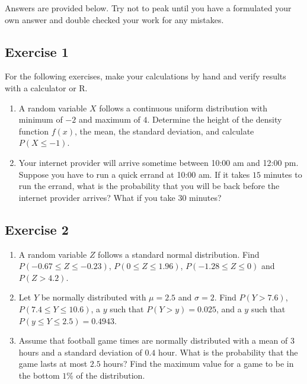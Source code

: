 \documentclass[
  letterpaper,
  DIV=11,
  numbers=noendperiod]{scrreprt}
\begin{document}
Answers are provided below. Try not to peak until you have a formulated
your own answer and double checked your work for any mistakes.

\hypertarget{exercise-1-18}{%
\subsection*{Exercise 1}\label{exercise-1-18}}

For the following exercises, make your calculations by hand and verify
results with a calculator or R.

\begin{enumerate}
\def\labelenumi{\arabic{enumi}.}
\item
  A random variable \(X\) follows a continuous uniform distribution with
  minimum of \(-2\) and maximum of \(4\). Determine the height of the
  density function \(f(x)\), the mean, the standard deviation, and
  calculate \(P(X \leq -1)\).
\item
  Your internet provider will arrive sometime between 10:00 am and 12:00
  pm. Suppose you have to run a quick errand at 10:00 am. If it takes
  \(15\) minutes to run the errand, what is the probability that you
  will be back before the internet provider arrives? What if you take
  \(30\) minutes?
\end{enumerate}

\hypertarget{exercise-2-18}{%
\subsection*{Exercise 2}\label{exercise-2-18}}

\begin{enumerate}
\def\labelenumi{\arabic{enumi}.}
\item
  A random variable \(Z\) follows a standard normal distribution. Find
  \(P(-0.67 \leq Z \leq -0.23)\), \(P(0 \leq Z \leq 1.96)\),
  \(P(-1.28 \leq Z \leq 0)\) and \(P(Z > 4.2)\).
\item
  Let \(Y\) be normally distributed with \(\mu=2.5\) and \(\sigma=2\).
  Find \(P(Y>7.6)\), \(P(7.4 \leq Y \leq 10.6)\), a \(y\) such that
  \(P(Y>y)=0.025\), and a \(y\) such that
  \(P(y \leq Y \leq 2.5)=0.4943\).
\item
  Assume that football game times are normally distributed with a mean
  of \(3\) hours and a standard deviation of \(0.4\) hour. What is the
  probability that the game lasts at most \(2.5\) hours? Find the
  maximum value for a game to be in the bottom \(1\)\% of the
  distribution.
\end{enumerate}
\end{document}

